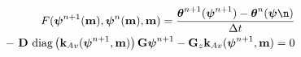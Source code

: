 \begin{align}
\label{eq:richards-timestep}
F(\boldsymbol{\psi}^{n+1}(\mathbf{m}),\boldsymbol{\psi}^n(\mathbf{m}),\mathbf{m}) =
\frac{\boldsymbol{\theta}^{n+1}(\boldsymbol{\psi}^{n+1}) - \boldsymbol{\theta}^n(\boldsymbol{\psi}\n)}{\Delta t}
\nonumber\\-
\ \mathbf{D}
    \text{ diag}\left(\mathbf{k}_{Av}(\boldsymbol{\psi}^{n+1},\mathbf{m})\right)
    \mathbf{G} \boldsymbol{\psi}^{n+1}
-
\mathbf{G}_{z} \mathbf{k}_{Av}(\boldsymbol{\psi}^{n+1},\mathbf{m})
= 0
\end{align}

